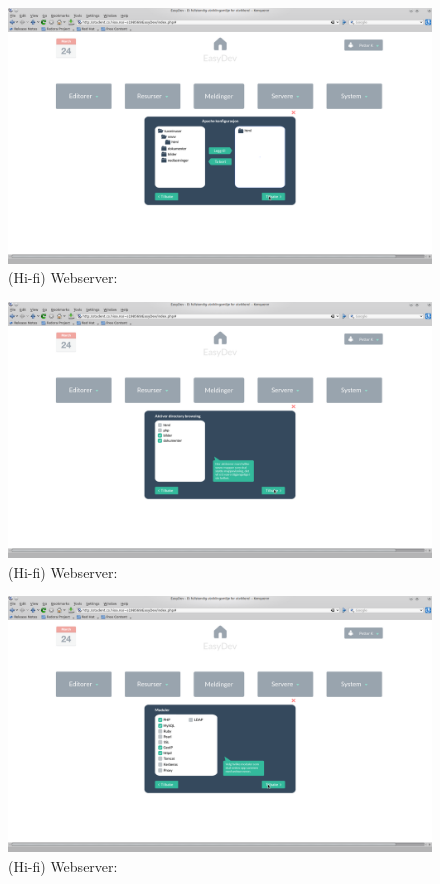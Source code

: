 \begin{figure}[ht]
\includegraphics[width=\textwidth,height=\textheight,keepaspectratio]{./img/prosessdokumentasjon/hifi/a2.png}
\caption{(Hi-fi) Webserver: }
\label{fig:apachehi2}
\end{figure}

\begin{figure}[ht]
\includegraphics[width=\textwidth,height=\textheight,keepaspectratio]{./img/prosessdokumentasjon/hifi/a3.png}
\caption{(Hi-fi) Webserver: }
\label{fig:apachehi3}
\end{figure}

\begin{figure}[ht]
\includegraphics[width=\textwidth,height=\textheight,keepaspectratio]{./img/prosessdokumentasjon/hifi/a4.png}
\caption{(Hi-fi) Webserver: }
\label{fig:apachehi4}
\end{figure}

